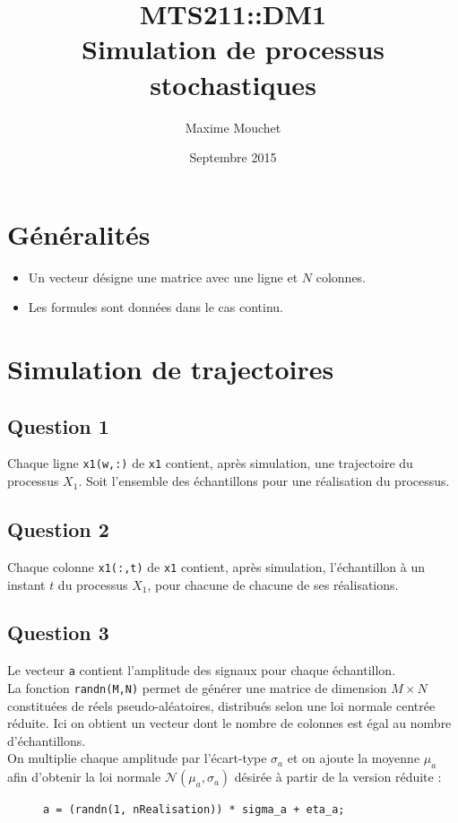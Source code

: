 \documentclass{article}
\title{MTS211::DM1 \\ Simulation de processus stochastiques}
\author{Maxime Mouchet}
\date{Septembre 2015}
\begin{document}
\maketitle

\section{Généralités}

\begin{itemize}
\item Un vecteur désigne une matrice avec une ligne et $N$ colonnes.
\item Les formules sont données dans le cas continu.
\end{itemize}


\section{Simulation de trajectoires}

\subsection*{Question 1}
Chaque ligne \texttt{x1(w,:)} de \texttt{x1} contient, après simulation, une trajectoire du processus $X_1$. Soit l'ensemble des échantillons pour une réalisation du processus.

\subsection*{Question 2}
Chaque colonne \texttt{x1(:,t)} de \texttt{x1} contient, après simulation, l'échantillon à un instant $t$ du processus $X_1$, pour chacune de chacune de ses réalisations.

\subsection*{Question 3}
Le vecteur \texttt{a} contient l'amplitude des signaux pour chaque échantillon. \\
La fonction \texttt{randn(M,N)} permet de générer une matrice de dimension $M \times N$ constituées de réels pseudo-aléatoires, distribués selon une loi normale centrée réduite. Ici on obtient un vecteur dont le nombre de colonnes est égal au nombre d'échantillons. \\
On multiplie chaque amplitude par l'écart-type $\sigma_a$ et on ajoute la moyenne $\mu_a$ afin d'obtenir la loi normale $\mathcal{N}(\mu_a,\sigma_a)$ désirée à partir de la version réduite :
\begin{figure}[h]
\centering
\begin{verbatim}
a = (randn(1, nRealisation)) * sigma_a + eta_a;
\end{verbatim}
\end{figure}
\end{document}

